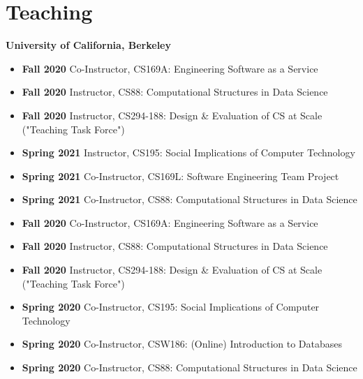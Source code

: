 \section{Teaching}

\vspace{6pt}

\textbf{University of California, Berkeley}

\vspace{5pt}

\begin{itemize}

  \setlength\itemsep{1em}
    \item \textbf{Fall 2020} Co-Instructor, CS169A: Engineering Software as a Service

    \item \textbf{Fall 2020} Instructor, CS88: Computational Structures in Data Science
    
    \item \textbf{Fall 2020} Instructor, CS294-188: Design \& Evaluation of CS at Scale ("Teaching Task Force")

    \item \textbf{Spring 2021} Instructor, CS195: Social Implications of Computer Technology
        
    \item \textbf{Spring 2021} Co-Instructor, CS169L: Software Engineering Team Project
    
    \item \textbf{Spring 2021} Co-Instructor, CS88: Computational Structures in Data Science
    
    \item \textbf{Fall 2020} Co-Instructor, CS169A: Engineering Software as a Service

    \item \textbf{Fall 2020} Instructor, CS88: Computational Structures in Data Science
    
    \item \textbf{Fall 2020} Instructor, CS294-188: Design \& Evaluation of CS at Scale ("Teaching Task Force")
    
    \item \textbf{Spring 2020} Co-Instructor, CS195: Social Implications of Computer Technology
      
    \item \textbf{Spring 2020} Co-Instructor, CSW186: (Online) Introduction to Databases
    
    \item \textbf{Spring 2020} Co-Instructor, CS88: Computational Structures in Data Science


\end{itemize}
